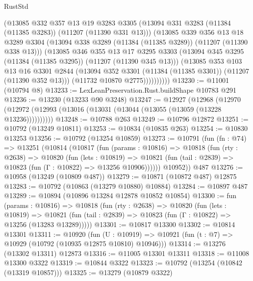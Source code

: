 \begin{lexlean}{RustStd}
\begin{coremodule}
              (@13085
                @332
                @357
                @13
                @19
                @3283
                @3305
                (@13094 @331 @3283 (@11384 (@11385 @3283)) (@11207 (@11390 @331 @13)))
                (@13085
                  @339
                  @356
                  @13
                  @18
                  @3289
                  @3304
                  (@13094 @338 @3289 (@11384 (@11385 @3289)) (@11207 (@11390 @338 @13)))
                  (@13085
                    @346
                    @355
                    @13
                    @17
                    @3295
                    @3303
                    (@13094 @345 @3295 (@11384 (@11385 @3295)) (@11207 (@11390 @345 @13)))
                    (@13085
                      @353
                      @103
                      @13
                      @16
                      @3301
                      @2844
                      (@13094 @352 @3301 (@11384 (@11385 @3301)) (@11207 (@11390 @352 @13)))
                      (@11732 @10870 @2775))))))))))
@13230 := @11001 (@10794 @8)
@13233 := LexLeanPreservation.Rust.buildShape @10783 @291
@13236 := @13230 (@13233 @90 @3248)
@13247 := @12927
    (@12968 (@12970 (@12972 (@12993 (@13016 (@13031 (@13044 (@13055 (@13059 (@13228 @13236))))))))))
@13248 := @10788 @263
@13249 := @10796 @12872
@13251 := @10792 (@13249 @10811)
@13253 := @10834 (@10835 @263)
@13254 := @10830 @13253
@13256 := @10792 (@13254 @10859)
@13273 := @10791
    (fun (fn : @74) =>
    @13251
      (@10814
        (@10817
          (fun (params : @10816) =>
          @10818
            (fun (rty : @2638) =>
            @10820
              (fun (lets : @10819) =>
              @10821 (fun (tail : @2839) => @10823 (fun (Γ : @10822) => @13256 @10906))))))
        @10952))
    @487
@13276 := @10958 (@13249 (@10809 @487))
@13279 := @10871 (@10872 @487) @12875
@13283 := @10792 (@10863 (@13279 @10880) @10884)
@13284 := @10897 @487
@13289 := @10894 (@10896 @13284 @12878 @10852 @10854)
@13300 := fun (params : @10816) =>
  @10818
    (fun (rty : @2638) =>
    @10820
      (fun (lets : @10819) =>
      @10821 (fun (tail : @2839) => @10823 (fun (Γ : @10822) => @13256 (@13283 @13289)))))
@13301 := @10817 @13300
@13302 := @10814 @13301
@13311 := @10920
    (fun (U : @10919) => @10921 (fun (t : @7) => @10929 (@10792 (@10935 @12875 @10810) @10946)))
@13314 := @13276 (@13302 @13311) @12873
@13316 := @11005 @13301 @13311
@13318 := @11008 @13300 @3322
@13319 := @10844 @3322
@13323 := @10792 (@13254 (@10842 (@13319 @10857)))
@13325 := @13279 (@10879 @3322)

\end{coremodule}
\end{lexlean}
